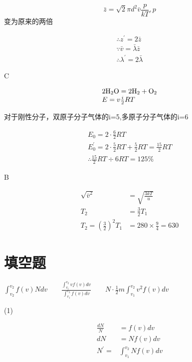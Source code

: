 \documentclass[b5paper,opensource]{./template/qyxf-book}
\begin{document}
$$
\bar { z } = \sqrt { 2 } \pi d ^ { 2 } \bar { v } \frac { p } { k T },p
$$变为原来的两倍

$$
\begin{array} { l } 
{ \therefore z ^ { \prime } = 2 \bar { z } } \\ 
{ \because \bar { v } = \bar { \lambda } \bar { z } } \\
 { \therefore \lambda ^ { \prime } = 2 \bar { \lambda } }
\end{array}
$$

C

\solve

$$
\begin{array} { l } 
{ 2\ce{H2O} = 2\ce{H2}+\ce{O2}}\\
{ E = v\frac{i}{2}RT} 
\end{array}
$$

对于刚性分子，双原子分子气体的i=5,多原子分子气体的i=6

$$
\begin{array} { l }
 E _ { 0 } = 2 \cdot \frac { 6 } { 2 } R T \\ E _ { 0 } ^ { \prime } = 2 \cdot \frac { 5 } { 2 } R T + \frac { 5 } { 2 } R T = \frac { 15 } { 2 } R T \\ \therefore \frac { 15 } { 2 } R T \div 6 R T = 125 \% 
\end{array}
$$

B

\solve

$$
\begin{aligned} 
\sqrt { \bar { v } ^ { 2 } } & = \sqrt { \frac { 3 k T } { u } } \\ T _ { 2 } & = \frac { 3 } { 2 } T _ { 1 } \\ T _ { 2 } = \left( \frac { 3 } { 2 } \right) ^ { 2 } T _ { 1 } & = 280 \times \frac { 9 } { 4 } = 630 
\end{aligned}
$$
\section{填空题}
$
\int _ { v _ { 2 } } ^ { v _ { 2 } } f ( v ) N d v
\qquad
\frac { \int _ { v _ { 1 } } ^ { v _ { 2 } } v f ( v ) d v } { \int _ { v _ { 1 } } ^ { v _ { 2 } } f ( v ) d v }
\qquad
N \cdot \frac { 1 } { 2 } m \int _ { v _ { 1 } } ^ { v _ { 2 } } v ^ { 2 } f ( v ) d v
$

\solve
(1)

$$
\begin{aligned} \frac { d N } { N } & = f ( v ) d v \\ d N & = N f ( v ) d v \\ N ^ { \prime } = & \int _ { v_1 } ^ { v _ { 2 } } N f ( v ) d v \end{aligned}
$$
\end{document}
